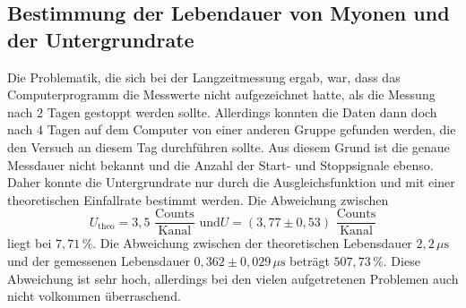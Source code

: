 \subsection{Bestimmung der Lebendauer von Myonen und der Untergrundrate}
Die Problematik, die sich bei der Langzeitmessung ergab, war, dass das Computerprogramm die Messwerte nicht aufgezeichnet hatte, als
die Messung nach $2$ Tagen gestoppt werden sollte. Allerdings konnten die Daten dann doch nach $4$ Tagen auf dem Computer von einer 
anderen Gruppe gefunden werden, die den Versuch an diesem Tag durchführen sollte. Aus diesem Grund ist die genaue Messdauer nicht
bekannt und die Anzahl der Start- und Stoppsignale ebenso. Daher konnte die Untergrundrate nur durch die Ausgleichsfunktion und 
mit einer theoretischen Einfallrate bestimmt werden. Die Abweichung zwischen 
$$U_{\text{theo}} = 3,5 \,\, \frac{\text{Counts}}{\text{Kanal}}\,\, \text{und} U = (3,77 \pm 0,53) \,\, \frac{\text{Counts}}{\text{Kanal}}$$
liegt bei $7,71 \, \%$. Die Abweichung zwischen der theoretischen Lebensdauer $2,2 \, \unit{\mu\second}$ und der gemessenen Lebensdauer 
$0,362 \pm 0,029 \, \unit{\mu\second}$ beträgt $507,73 \, \%$. Diese Abweichung ist sehr hoch, allerdings bei den vielen aufgetretenen 
Problemen auch nicht volkommen überraschend.  

